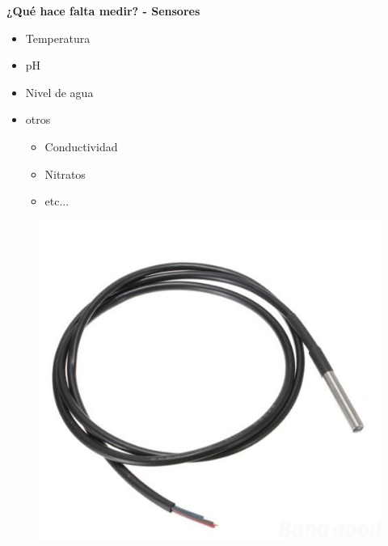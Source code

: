 \documentclass{beamer}
\begin{document}
\begin{frame}{\textbf{¿Qué hace falta medir? - Sensores}}
\fontsize{14pt}{15}\selectfont

\begin{minipage}[c]{1.0\linewidth}
\begin{minipage}[c]{0.6\linewidth}
      \centering
      \begin{itemize}
      	\item Temperatura
		\vspace{10px}
		\item pH
		\vspace{10px}
		\item Nivel de agua
		\vspace{10px}
		\item otros
			\begin{itemize}
				\item Conductividad
				\item Nitratos
				\item etc...
			\end{itemize}
	\end{itemize}
 \end{minipage}
  \begin{minipage}[c]{0.35\linewidth}
	\begin{figure}[H]
		{\includegraphics[width=1\textwidth]{./imagenes/sensor_temp}\vspace{5px}}

\end{figure}
\end{minipage}
\end{minipage}
\end{frame}
\end{document}
